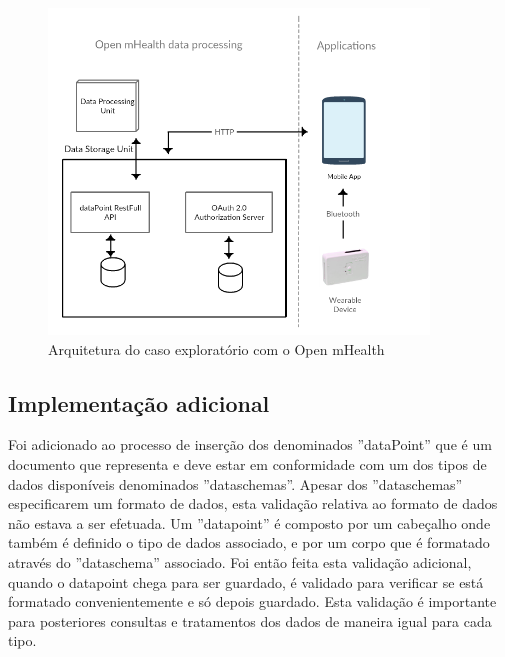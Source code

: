 \begin{figure}[H]
  \centering
  \includegraphics[width=0.9\textwidth]{imgs/omh-arch-exp.png}
  \caption[Arquitetura do caso exploratório com o Open mHealth]{Arquitetura do caso exploratório com o Open mHealth}
  
  \label{f:exp-omh-arch}
\end{figure}

\subsection{Implementação adicional}

Foi adicionado ao processo de inserção dos denominados ''dataPoint'' que é um documento que representa e deve estar em conformidade com um dos tipos de dados disponíveis denominados ''dataschemas''. Apesar dos ''dataschemas'' especificarem um formato de dados, esta validação relativa ao formato de dados não estava a ser efetuada. Um ''datapoint'' é composto por um cabeçalho onde também é definido o tipo de dados associado, e por um corpo que é formatado através do ''dataschema'' associado. Foi então feita esta validação adicional, quando o datapoint chega para ser guardado, é validado para verificar se está formatado convenientemente e só depois guardado. Esta validação é importante para posteriores consultas e tratamentos dos dados de maneira igual para cada tipo.
\par 



